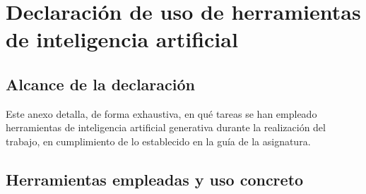 \chapter{Declaración de uso de herramientas de inteligencia artificial}
\label{anexo:ia}

%
%
%
%

\section{Alcance de la declaración}
\label{sec:ia_alcance}
Este anexo detalla, de forma exhaustiva, en qué tareas se han empleado herramientas de
inteligencia artificial generativa durante la realización del trabajo, en cumplimiento de
lo establecido en la guía de la asignatura.

\section{Herramientas empleadas y uso concreto}
\label{sec:ia_herramientas}

